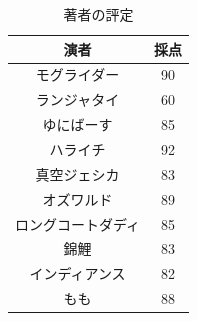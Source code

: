 \begin{table}[ht]
	\centering
	\caption{著者の評定}
	\begin{tabular}{cc}
		演者        & 採点 \\\hline
		モグライダー    & 90 \\
		ランジャタイ    & 60 \\
		ゆにばーす     & 85 \\
		ハライチ      & 92 \\
		真空ジェシカ    & 83 \\
		オズワルド     & 89 \\
		ロングコートダディ & 85 \\
		錦鯉        & 83 \\
		インディアンス   & 82 \\
		もも        & 88 \\\hline
	\end{tabular}
	\label{tbl:x15_kosugiRatio}
\end{table}
